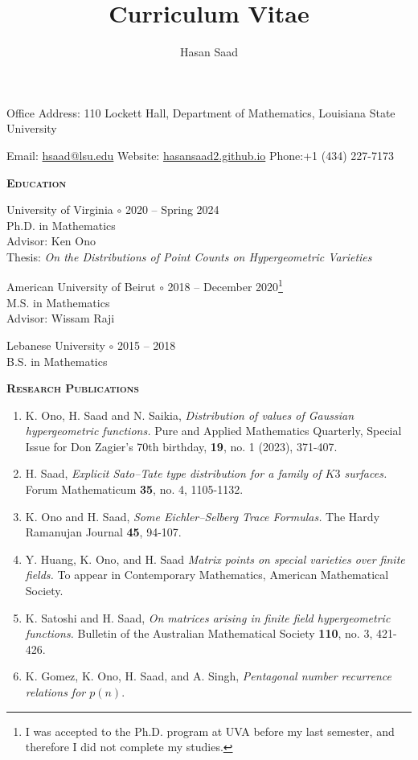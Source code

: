 \documentclass[11pt]{amsart}
\title{\large{Curriculum Vitae}}
\author{\large{Hasan Saad}}
\theoremstyle{remark}
\begin{document}
\textbf{ }


\maketitle 


\large{Office Address: 110 Lockett Hall, Department of Mathematics, Louisiana State University}

\large{Email: \href{mailto:hsaad@lsu.edu}{hsaad@lsu.edu} \hfill Website: \href{https://hasansaad2.github.io/}{hasansaad2.github.io} \hfill Phone:+1 (434) 227-7173}

\vspace{.1in}


\large{\textbf{\textsc{\textsc{Education}}}

University of Virginia $\circ$ 2020 -- Spring 2024 \\
Ph.D. in Mathematics\\ Advisor: Ken Ono \\
Thesis: \textit{On the Distributions of Point Counts on Hypergeometric Varieties}

\vspace{.1in}

American University of Beirut $\circ$ 2018 -- December 2020\footnote{I was accepted to the Ph.D. program at UVA before my last semester, and therefore I did not complete my studies.} \\
M.S. in Mathematics\\ Advisor: Wissam Raji

\vspace{.1in}

Lebanese University $\circ$ 2015 -- 2018 \\
B.S. in Mathematics

\vspace{.1in}


\large{\textbf{\textsc{Research Publications}}}
\begin{enumerate}[label=\arabic*.]
\item K. Ono, H. Saad and N. Saikia, \textit{Distribution of values of Gaussian hypergeometric functions.}  Pure and Applied Mathematics Quarterly, Special Issue for Don Zagier’s 70th birthday, {\bf 19}, no. 1 (2023), 371-407. 
\item H. Saad, \textit{Explicit Sato--Tate type distribution for a family of $K3$ surfaces.} Forum Mathematicum {\bf 35}, no. 4, 1105-1132.
\item K. Ono and H. Saad, \textit{Some Eichler--Selberg Trace Formulas.} The Hardy Ramanujan Journal {\bf 45}, 94-107.
\item Y. Huang, K. Ono, and H. Saad \textit{Matrix points on special varieties over finite fields.} To appear in Contemporary Mathematics, American Mathematical Society.
\item K. Satoshi and H. Saad, \textit{On matrices arising in finite field hypergeometric functions.} Bulletin of the Australian Mathematical Society {\bf 110}, no. 3, 421-426.
\item K. Gomez, K. Ono, H. Saad, and A. Singh, \textit{Pentagonal number recurrence relations for $p(n).$}
\end{enumerate}

}
\end{document}
